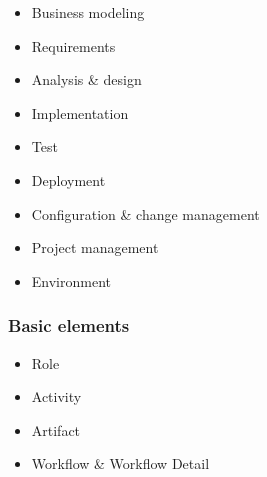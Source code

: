 \documentclass[../ESOF_notes.tex]{subfiles}
\begin{document}
\begin{itemize}
    \item Business modeling
    \item Requirements
    \item Analysis \& design
    \item Implementation
    \item Test
    \item Deployment
    \item Configuration \& change management
    \item Project management
    \item Environment
\end{itemize}

\subsubsection{Basic elements}
\begin{itemize}
    \item Role
    \item Activity
    \item Artifact
    \item Workflow \& Workflow Detail
\end{itemize}
\end{document}
